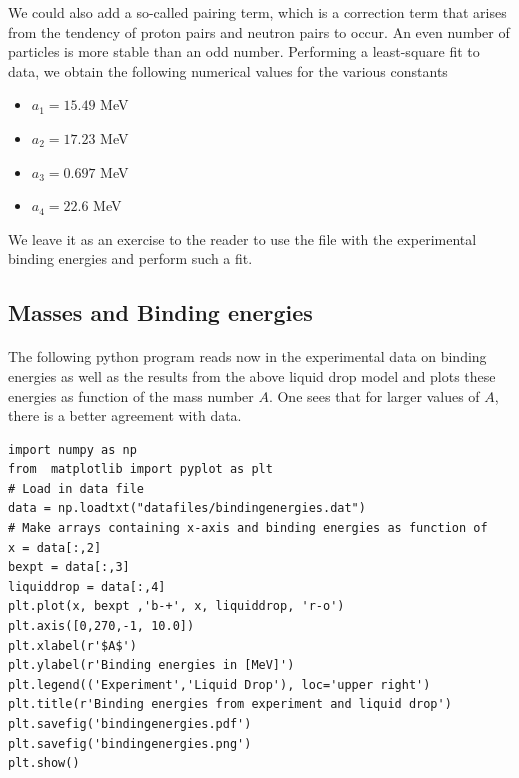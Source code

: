 \documentclass[%
twoside,                 %
final,                   %
10pt]{article}
\begin{document}
\noindent
We could also add a so-called pairing term, which is a correction term that
arises from the tendency of proton pairs and neutron pairs to
occur. An even number of particles is more stable than an odd number. 
Performing a least-square fit to data, we obtain the following numerical values for the various constants
\begin{itemize}
\item $a_1=15.49$ MeV

\item $a_2=17.23$ MeV

\item $a_3=0.697$ MeV

\item $a_4=22.6$ MeV
\end{itemize}

\noindent
We leave it as an exercise to the reader to use the file with the experimental binding energies and perform such a fit.



\subsection*{Masses and Binding energies}

\paragraph{}
The following python program reads now in the experimental data on binding energies as well as the results from the above liquid drop model and plots these energies as function of the mass number $A$. One sees that for larger values of $A$, there is a better agreement with data. 
\begin{verbatim}
import numpy as np
from  matplotlib import pyplot as plt
# Load in data file
data = np.loadtxt("datafiles/bindingenergies.dat")
# Make arrays containing x-axis and binding energies as function of
x = data[:,2]
bexpt = data[:,3]
liquiddrop = data[:,4]
plt.plot(x, bexpt ,'b-+', x, liquiddrop, 'r-o')
plt.axis([0,270,-1, 10.0])
plt.xlabel(r'$A$')
plt.ylabel(r'Binding energies in [MeV]')
plt.legend(('Experiment','Liquid Drop'), loc='upper right')
plt.title(r'Binding energies from experiment and liquid drop')
plt.savefig('bindingenergies.pdf')
plt.savefig('bindingenergies.png')
plt.show()
\end{verbatim}
\end{document}
